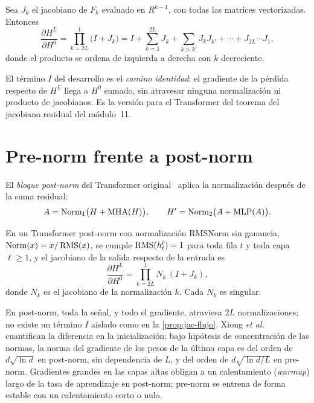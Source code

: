 \addtocounter{definicion}{1}%

\begin{proposicion}\label{prop:jac-flujo}
Sea $J_k$ el jacobiano de $F_k$ evaluado en $R^{k-1}$, con todas las matrices vectorizadas. Entonces
\[
\frac{\partial H^{L}}{\partial H^{0}}=\prod_{k=2L}^{1}\bigl(I+J_k\bigr)=I+\sum_{k=1}^{2L}J_k+\sum_{k>k'}J_kJ_{k'}+\cdots+J_{2L}\cdots J_1,
\]
donde el producto se ordena de izquierda a derecha con $k$ decreciente.
\end{proposicion}

El término $I$ del desarrollo es el \emph{camino identidad}: el gradiente de la pérdida respecto de $H^{L}$ llega a $H^{0}$ sumado, sin atravesar ninguna normalización ni producto de jacobianos. Es la versión para el Transformer del teorema del jacobiano residual del módulo~11.

\section{Pre-norm frente a post-norm}

\begin{definicion}\label{def:postnorm}
El \emph{bloque post-norm} del Transformer original~\cite[§3.1]{vaswani} aplica la normalización después de la suma residual:
\[
A=\operatorname{Norm}_1\bigl(H+\operatorname{MHA}(H)\bigr),\qquad H'=\operatorname{Norm}_2\bigl(A+\operatorname{MLP}(A)\bigr).
\]
\end{definicion}

\begin{proposicion}\label{prop:postnorm}
En un Transformer post-norm con normalización RMSNorm sin ganancia, $\operatorname{Norm}(x)=x/\operatorname{RMS}(x)$, se cumple $\operatorname{RMS}(h^{\ell}_t)=1$ para toda fila $t$ y toda capa $\ell\ge 1$, y el jacobiano de la salida respecto de la entrada es
\[
\frac{\partial H^{L}}{\partial H^{0}}=\prod_{k=2L}^{1}N_k\,(I+J_k),
\]
donde $N_k$ es el jacobiano de la normalización $k$. Cada $N_k$ es singular.
\end{proposicion}

En post-norm, toda la señal, y todo el gradiente, atraviesa $2L$ normalizaciones; no existe un término $I$ aislado como en la \cref{prop:jac-flujo}. Xiong \emph{et al.}~\cite[§3.3, teorema~1]{xiong} cuantifican la diferencia en la inicialización: bajo hipótesis de concentración de las normas, la norma del gradiente de los pesos de la última capa es del orden de $d\sqrt{\ln d}$ en post-norm, sin dependencia de $L$, y del orden de $d\sqrt{\ln d/L}$ en pre-norm. Gradientes grandes en las capas altas obligan a un calentamiento (\emph{warmup}) largo de la tasa de aprendizaje en post-norm; pre-norm se entrena de forma estable con un calentamiento corto o nulo.

